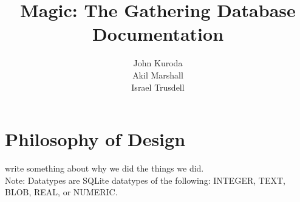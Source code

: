 \documentclass{article}
\title{Magic: The Gathering Database Documentation}
\author{John Kuroda\\Akil Marshall\\Israel Trusdell}
\begin{document}
\maketitle
\newpage
\tableofcontents
\newpage
\section{Philosophy of Design}
write something about why we did the things we did.
\\
Note: Datatypes are SQLite datatypes of the following:  INTEGER, TEXT, BLOB, REAL, or NUMERIC.
\end{document}
